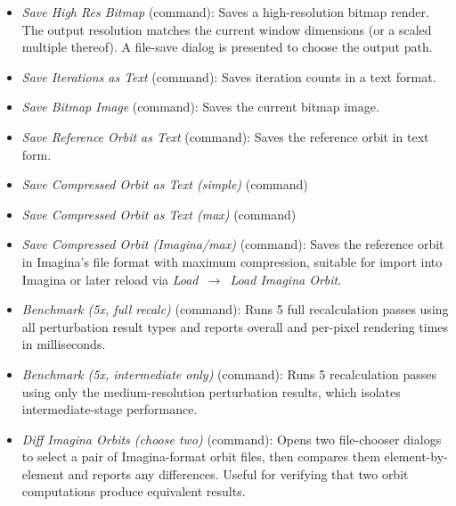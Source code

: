 \begin{itemize}
\begin{itemize}
      The CLI writes the total and checkpointed frame counts, completion
      percentage, durable stream length, and active wall time together in
      . The elapsed time is in milliseconds and excludes
      downtime. On restart, the CLI truncates any uncommitted suffix and
      continues after the last checkpointed frame. Press  or hold
       for three seconds to save the completed prefix and pause.
      The final  is published when the last frame is durable.
      Jobs from earlier state formats require a new job folder.
      \item \emph{Save High Res Bitmap} (command): Saves a high-resolution
      bitmap render.  The output resolution matches the current window
      dimensions (or a scaled multiple thereof).  A file-save dialog is
      presented to choose the output path.
      \item \emph{Save Iterations as Text} (command): Saves iteration counts in a text format.
      \item \emph{Save Bitmap Image} (command): Saves the current bitmap image.

      \item \emph{Save Reference Orbit as Text} (command): Saves the reference orbit in text form.
      \item \emph{Save Compressed Orbit as Text (simple)} (command)
      \item \emph{Save Compressed Orbit as Text (max)} (command)
      \item \emph{Save Compressed Orbit (Imagina/max)} (command): Saves the
      reference orbit in Imagina's file format with maximum compression,
      suitable for import into Imagina or later reload via
      \emph{Load~$\to$~Load Imagina Orbit}.

      \item \emph{Benchmark (5x, full recalc)} (command): Runs 5 full
      recalculation passes using all perturbation result types and reports
      overall and per-pixel rendering times in milliseconds.
      \item \emph{Benchmark (5x, intermediate only)} (command): Runs 5
      recalculation passes using only the medium-resolution perturbation
      results, which isolates intermediate-stage performance.

      \item \emph{Diff Imagina Orbits (choose two)} (command): Opens two
      file-chooser dialogs to select a pair of Imagina-format orbit files, then
      compares them element-by-element and reports any differences.  Useful for
      verifying that two orbit computations produce equivalent results.
    \end{itemize}


\end{itemize}
